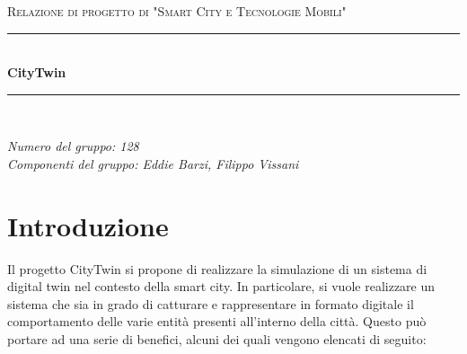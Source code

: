 \documentclass[12pt]{article}
\begin{document}
\renewcommand{\labelenumii}{\arabic{enumi}.\arabic{enumii}}
\renewcommand{\labelenumiii}{\arabic{enumi}.\arabic{enumii}.\arabic{enumiii}}
\renewcommand{\labelenumiv}{\arabic{enumi}.\arabic{enumii}.\arabic{enumiii}.\arabic{enumiv}}

\begin{titlepage}

\newcommand{\HRule}{\rule{\linewidth}{0.5mm}}

\center

\textsc{\Large Relazione di progetto di "Smart City e Tecnologie Mobili"}\\[0.5cm]

\HRule \\[0.4cm]
{ \huge \bfseries CityTwin}\\[0.4cm]
\HRule \\[1.5cm]

\vfill

\begin{flushleft}
\emph{Numero del gruppo: 128}\\[1cm]
\emph{Componenti del gruppo: Eddie Barzi, Filippo Vissani}\\[3cm]
\end{flushleft}

\end{titlepage}


\tableofcontents

\newpage


\section{Introduzione}

Il progetto CityTwin si propone di realizzare la simulazione di un sistema di digital twin nel contesto della smart city. In particolare, si vuole realizzare un sistema che sia in grado di catturare e rappresentare in formato digitale il comportamento delle varie entità presenti all'interno della città. Questo può portare ad una serie di benefici, alcuni dei quali vengono elencati di seguito:
\end{document}
